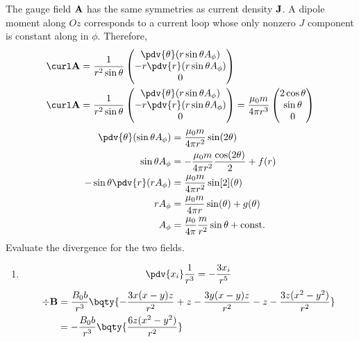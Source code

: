 \documentclass[12pt]{extarticle}
\begin{document}
    \begin{outline} 
        \1 The gauge field \(\bf A\) has the same symmetries as current density \(\bf J\). A dipole moment along \(Oz\) corresponds to a current loop whose only nonzero \(J\) component is constant along in \(\phi\). Therefore, \begin{align*}
            \curl \bf A &= \frac{1}{r^2\sin\theta}\begin{pmatrix} \pdv{\theta} (r\sin\theta A_\phi)\\- r\pdv{r} (r\sin\theta A_\phi)\\0\end{pmatrix}\\ 
            \curl \bf A &= \frac{1}{r^2\sin\theta}\begin{pmatrix} \pdv{\theta} (r\sin\theta A_\phi)\\- r\pdv{r} (r\sin\theta A_\phi)\\0\end{pmatrix} = \frac{\mu_0 m}{4\pi r^3}\begin{pmatrix} 2\cos\theta\\ \sin\theta\\0 \end{pmatrix}
        \end{align*} \begin{align*} 
            \pdv{\theta} (\sin\theta A_\phi) &= \frac{\mu_0 m}{4\pi r^2} \sin(2\theta)\\
            \sin\theta A_\phi &= -\frac{\mu_0 m}{4\pi r^2} \frac{\cos(2\theta)}{2} + f(r)\\
            -\sin\theta \pdv{r} (r A_\phi) &= \frac{\mu_0 m}{4\pi r^2} \sin[2](\theta)\\
            rA_\phi &= \frac{\mu_0 m}{4\pi r} \sin(\theta) + g(\theta)\\
            A_\phi &= \frac{\mu_0}{4\pi} \frac{m}{r^2}\sin\theta + \text{const.}
        \end{align*}
        \1 Evaluate the divergence for the two fields. 
        \begin{enumerate}
        \item \[
            \pdv{x_i} \frac{1}{r^3} = - \frac{3x_i}{r^5}
        \]
        \begin{align*}
            \div \bf B &= \frac{B_0 b}{r^3}\bqty{ - \frac{3x(x - y)z}{r^2} + z - \frac{3y(x - y)z}{r^2} - z - \frac{3z(x^2 - y^2)}{r^2} }\\
            &=- \frac{B_0 b}{r^3}\bqty{ \frac{6z(x^2 - y^2)}{r^2} }
        \end{align*}

\end{enumerate}
\end{outline}
\end{document}

